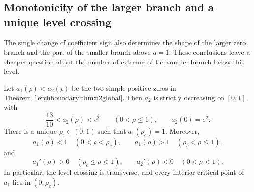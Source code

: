 
\subsection{Monotonicity of the larger branch and a unique level crossing}
\label{lerchshape:sec:n2}

The single change of coefficient sign also determines the shape of the
larger zero branch and the part of the smaller branch above $a=1$.
These conclusions leave a sharper question about the number of extrema
of the smaller branch below this level.

\begin{corollary}
\label{lerchshape:cor:n2}
Let $a_1(\rho)<a_2(\rho)$ be the two simple positive zeros in
Theorem~\ref{lerchboundary:thm:n2global}. Then $a_2$ is strictly
decreasing on $[0,1]$, with
\[
 \frac{13}{10}<a_2(\rho)<e^2\qquad(0<\rho\leq1),
 \qquad a_2(0)=e^2.
\]
There is a unique $\rho_c\in(0,1)$ such that $a_1(\rho_c)=1$.
Moreover,
\[
 a_1(\rho)<1\quad(0<\rho<\rho_c),\qquad
 a_1(\rho)>1\quad(\rho_c<\rho\leq1),
\]
and
\[
 a_1'(\rho)>0\quad(\rho_c\leq\rho<1),\qquad
 a_2'(\rho)<0\quad(0<\rho<1).
\]
In particular, the level crossing is transverse, and every interior
critical point of $a_1$ lies in $(0,\rho_c)$.
\end{corollary}

